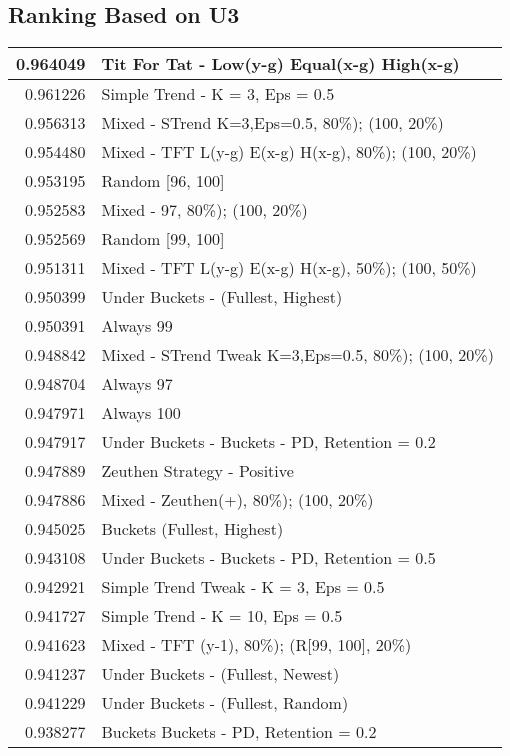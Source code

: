 \begin{table}[!hbtp]
\subsection{Ranking Based on U3}
\begin{footnotesize}
\begin{tabular}{|r|l|}\hline  \label{U3results}
0.964049 & Tit For Tat - Low(y-g) Equal(x-g) High(x-g)\\ \hline
0.961226 & Simple Trend - K = 3, Eps = 0.5\\ \hline
0.956313 & Mixed - {STrend K=3,Eps=0.5, 80\%); (100, 20\%)}\\ \hline
0.954480 & Mixed - {TFT L(y-g) E(x-g) H(x-g), 80\%); (100, 20\%)}\\ \hline
0.953195 & Random [96, 100]\\ \hline
0.952583 & Mixed - {97, 80\%); (100, 20\%)}\\ \hline
0.952569 & Random [99, 100]\\ \hline
0.951311 & Mixed - {TFT L(y-g) E(x-g) H(x-g), 50\%); (100, 50\%)}\\ \hline
0.950399 & Under Buckets - (Fullest, Highest)\\ \hline
0.950391 & Always 99\\ \hline
0.948842 & Mixed - {STrend Tweak K=3,Eps=0.5, 80\%); (100, 20\%)}\\ \hline
0.948704 & Always 97\\ \hline
0.947971 & Always 100\\ \hline
0.947917 & Under Buckets - Buckets - PD, Retention = 0.2\\ \hline
0.947889 & Zeuthen Strategy - Positive\\ \hline
0.947886 & Mixed - {Zeuthen(+), 80\%); (100, 20\%)}\\ \hline
0.945025 & Buckets (Fullest, Highest)\\ \hline
0.943108 & Under Buckets - Buckets - PD, Retention = 0.5\\ \hline
0.942921 & Simple Trend Tweak - K = 3, Eps = 0.5\\ \hline
0.941727 & Simple Trend - K = 10, Eps = 0.5\\ \hline
0.941623 & Mixed - {TFT (y-1), 80\%); (R[99, 100], 20\%)}\\ \hline
0.941237 & Under Buckets - (Fullest, Newest)\\ \hline
0.941229 & Under Buckets - (Fullest, Random)\\ \hline
0.938277 & Buckets Buckets - PD, Retention = 0.2\\ \hline

\end{tabular}
\end{footnotesize}
\end{table}

